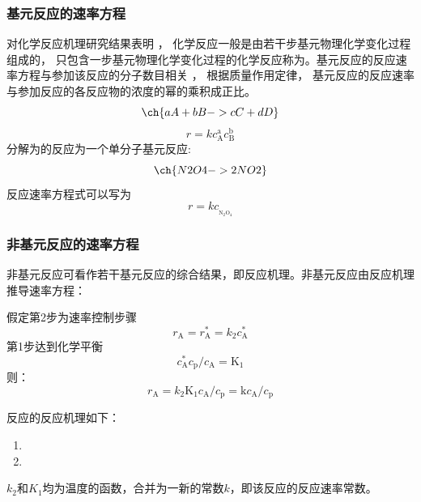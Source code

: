 \begin{frame}
    \frametitle{基元反应的速率方程}
    对化学反应机理研究结果表明 ， 化学反应一般是由若干步基元物理化学变化过程组成的，
只包含一步基元物理化学变化过程的化学反应称为。基元反应的反应速率方程与参加该反应的分子数目相关 ， 根据质量作用定律， 基元反应的反应速率与参加反应的各反应物的浓度的幂的乘积成正比。
    \[
        \ch{a A + b B -> c C + d D}
    \]
    \[
        r=kc_\mathrm{A}^{\mathrm{a}}c_\mathrm{B}^{\mathrm{b}}
    \]
    分解为的反应为一个单分子基元反应:
    \[
        \ch{N2O4 -> 2 NO2}
    \]
    反应速率方程式可以写为
    \[
        r = kc_{\mathrm{_{N_2O_4}}}
    \]
\end{frame}


\begin{frame}
    \frametitle{非基元反应的速率方程}
    非基元反应可看作若干基元反应的综合结果，即反应机理。非基元反应由反应机理推导速率方程：

    \smallskip
    \begin{minipage}{0.48\linewidth}
    假定第2步为速率控制步骤
    \[
        r_\mathrm{A}=r_\mathrm{A}^*=k_2c_\mathrm{A}^*
    \]
    第1步达到化学平衡
    \[
        c_\mathrm{A}^*c_\mathrm{p}/c_\mathrm{A}=\mathrm{K}_1
    \]
    则：
    \[
        r_\mathrm{A}=k_2\mathrm{K}_1c_\mathrm{A}/c_\mathrm{p}=\mathrm{k}c_\mathrm{A}/c_\mathrm{p}
    \]
    \end{minipage}\hfill
    \begin{minipage}{0.48\linewidth}
        \begin{framed}
        反应的反应机理如下：

        \begin{enumerate}
          \item[\large{\ding{172}}] 
          \item[\large{\ding{173}}] 
        \end{enumerate}
        \end{framed}
    \end{minipage}

    \smallskip
    $k_2$和$K_1$均为温度的函数，合并为一新的常数$k$，即该反应的反应速率常数。
\end{frame}


